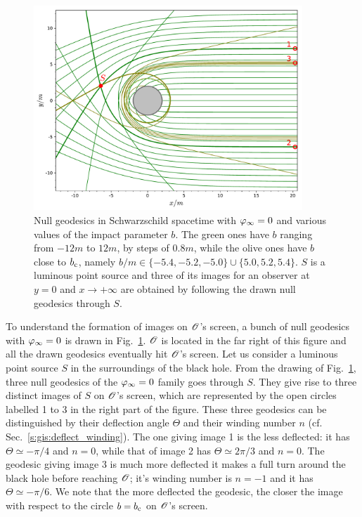 \begin{figure}
\centerline{\includegraphics[width=0.9\textwidth]{ges_mult_images.pdf}}
\caption[]{\label{f:gis:mult_images} \footnotesize
Null geodesics in Schwarzschild spacetime with $\varphi_\infty=0$ and various values of the impact parameter $b$.
The green ones have $b$ ranging from $-12 m$ to $12 m$, by steps of
$0.8 m$, while the olive ones have $b$ close to $b_{\rm c}$,
namely $b/m\in\{-5.4,-5.2,-5.0\} \cup \{5.0, 5.2, 5.4\}$. $S$ is a luminous point source
and three of its images for an observer at $y=0$ and $x\to + \infty$ are obtained by
following the drawn null geodesics through $S$.}
\end{figure}

To understand the formation of images on $\mathscr{O}$'s screen, a bunch of null
geodesics with $\varphi_\infty=0$ is drawn in Fig.~\ref{f:gis:mult_images}.
$\mathscr{O}$ is located in the far right of this figure and
all the drawn geodesics eventually hit $\mathscr{O}$'s screen. Let us consider a luminous point source
$S$ in the surroundings of the black hole. From the drawing of Fig.~\ref{f:gis:mult_images},
three null geodesics of the $\varphi_\infty=0$ family goes through $S$. They give rise to
three distinct images of $S$ on $\mathscr{O}$'s screen, which are represented by the
open circles labelled 1 to 3 in the right part of the figure. These three
geodesics can be distinguished by their deflection angle $\Theta$
and their winding number $n$ (cf. Sec.~\ref{s:gis:deflect_winding}).
The one giving image 1 is the less deflected: it has $\Theta \simeq - \pi/4$
and $n=0$, while that
of image 2 has $\Theta\simeq 2\pi/3$ and $n=0$.
The geodesic giving image 3 is much more deflected
it makes a full turn around
the black hole before reaching $\mathscr{O}$; it's winding number is $n=-1$ and
it has $\Theta\simeq -\pi/6$.
We note that the more deflected the geodesic,
the closer the image with respect to the circle $b = b_{\rm c}$ on $\mathscr{O}$'s
screen.

